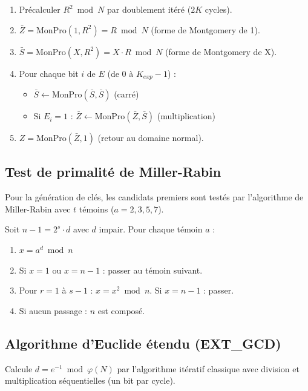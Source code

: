 \documentclass[12pt,a4paper]{report}
\begin{document}
\begin{enumerate}
  \item Précalculer $R^2 \bmod N$ par doublement itéré ($2K$ cycles).
  \item $\bar{Z} = \text{MonPro}(1, R^2) = R \bmod N$ (forme de Montgomery de 1).
  \item $\bar{S} = \text{MonPro}(X, R^2) = X \cdot R \bmod N$ (forme de
        Montgomery de X).
  \item Pour chaque bit $i$ de $E$ (de 0 à $K_{exp}-1$) :
  \begin{itemize}
    \item $\bar{S} \leftarrow \text{MonPro}(\bar{S}, \bar{S})$ \quad (carré)
    \item Si $E_i = 1$ : $\bar{Z} \leftarrow \text{MonPro}(\bar{Z}, \bar{S})$
          \quad (multiplication)
  \end{itemize}
  \item $Z = \text{MonPro}(\bar{Z}, 1)$ \quad (retour au domaine normal).
\end{enumerate}

\subsection{Test de primalité de Miller-Rabin}

Pour la génération de clés, les candidats premiers sont testés par
l'algorithme de Miller-Rabin avec $t$ témoins ($a = 2, 3, 5, 7$).

Soit $n - 1 = 2^s \cdot d$ avec $d$ impair. Pour chaque témoin $a$ :
\begin{enumerate}
  \item $x = a^d \bmod n$
  \item Si $x = 1$ ou $x = n-1$ : passer au témoin suivant.
  \item Pour $r = 1$ à $s-1$ : $x = x^2 \bmod n$. Si $x = n-1$ : passer.
  \item Si aucun passage : $n$ est composé.
\end{enumerate}

\subsection{Algorithme d'Euclide étendu (EXT\_GCD)}
Calcule $d = e^{-1} \bmod \varphi(N)$ par l'algorithme itératif classique
avec division et multiplication séquentielles (un bit par cycle).


\end{document}
